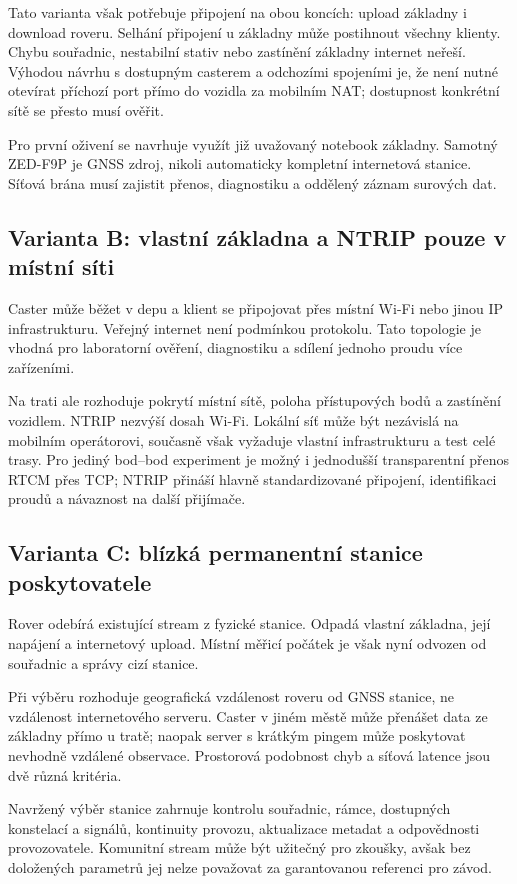 \documentclass[11pt,a4paper]{article}
\begin{document}
Tato varianta však potřebuje připojení na obou koncích: upload základny i download roveru. Selhání připojení u základny může postihnout všechny klienty. Chybu souřadnic, nestabilní stativ nebo zastínění základny internet neřeší. Výhodou návrhu s dostupným casterem a odchozími spojeními je, že není nutné otevírat příchozí port přímo do vozidla za mobilním NAT; dostupnost konkrétní sítě se přesto musí ověřit.

Pro první oživení se navrhuje využít již uvažovaný notebook základny. Samotný ZED-F9P je GNSS zdroj, nikoli automaticky kompletní internetová stanice. Síťová brána musí zajistit přenos, diagnostiku a oddělený záznam surových dat.

\subsection{Varianta B: vlastní základna a NTRIP pouze v místní síti}
Caster může běžet v depu a klient se připojovat přes místní Wi-Fi nebo jinou IP infrastrukturu. Veřejný internet není podmínkou protokolu. Tato topologie je vhodná pro laboratorní ověření, diagnostiku a sdílení jednoho proudu více zařízeními.

Na trati ale rozhoduje pokrytí místní sítě, poloha přístupových bodů a zastínění vozidlem. NTRIP nezvýší dosah Wi-Fi. Lokální síť může být nezávislá na mobilním operátorovi, současně však vyžaduje vlastní infrastrukturu a test celé trasy. Pro jediný bod--bod experiment je možný i jednodušší transparentní přenos RTCM přes TCP; NTRIP přináší hlavně standardizované připojení, identifikaci proudů a návaznost na další přijímače.

\subsection{Varianta C: blízká permanentní stanice poskytovatele}
Rover odebírá existující stream z fyzické stanice. Odpadá vlastní základna, její napájení a internetový upload. Místní měřicí počátek je však nyní odvozen od souřadnic a správy cizí stanice.

Při výběru rozhoduje geografická vzdálenost roveru od GNSS stanice, ne vzdálenost internetového serveru. Caster v jiném městě může přenášet data ze základny přímo u tratě; naopak server s krátkým pingem může poskytovat nevhodně vzdálené observace. Prostorová podobnost chyb a síťová latence jsou dvě různá kritéria.

Navržený výběr stanice zahrnuje kontrolu souřadnic, rámce, dostupných konstelací a signálů, kontinuity provozu, aktualizace metadat a odpovědnosti provozovatele. Komunitní stream může být užitečný pro zkoušky, avšak bez doložených parametrů jej nelze považovat za garantovanou referenci pro závod.
\end{document}

